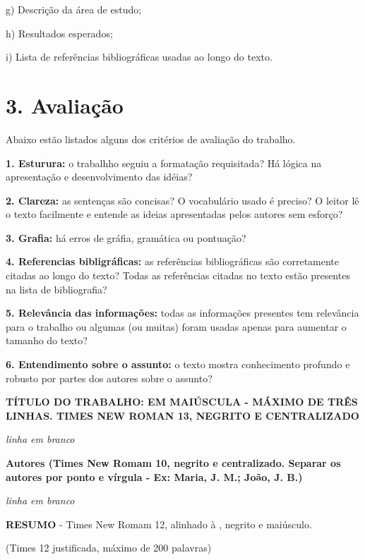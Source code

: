 \documentclass[a4paper,10pt]{article}
\begin{document}
    g) Descrição da área de estudo;
    
    h) Resultados esperados;
        
    i) Lista de referências bibliográficas usadas ao longo do texto. 
  
   \section* {3. Avaliação}
   \noindent
   
    Abaixo estão listados alguns dos critérios de avaliação do trabalho.
    
    \textbf{1. Esturura:} o trabalhho seguiu a formatação requisitada? Há lógica na apresentação e desenvolvimento das idéias? 
    
    \textbf{2. Clareza:} as sentenças são concisas? O vocabulário usado é preciso? O leitor lê o texto facilmente e entende as ideias apresentadas pelos autores sem esforço?
    
    \textbf{3. Grafia:} há erros de gráfia, gramática ou pontuação? 
    
    \textbf{4. Referencias bibligráficas:} as referências bibliográficas são corretamente citadas ao longo do texto? Todas as referências citadas no texto estão presentes na lista de bibliografia? 
    
    \textbf{5. Relevância das informações:} todas as informações presentes tem relevância para o trabalho ou algumas (ou muitas) foram usadas apenas para aumentar o tamanho do texto? 
    
    \textbf{6. Entendimento sobre o assunto:} o texto mostra conhecimento profundo e robusto por partes dos autores sobre o assunto? 

\newpage %
   
  {\centering
  \textbf{TÍTULO DO TRABALHO: EM MAIÚSCULA - MÁXIMO DE TRÊS LINHAS. TIMES NEW ROMAN 13, NEGRITO E  CENTRALIZADO}
  
  \textit{linha em branco}
  
  \textbf{Autores (Times New Romam 10, negrito e centralizado. Separar os autores por ponto e vírgula - Ex: Maria, J. M.; João, J. B.)}
  
  \textit{linha em branco}
  
  \par
  }
  
  \noindent
  \textbf{RESUMO} - Times New Romam 12, alinhado à , negrito e maiúsculo. 
  
  (Times 12 justificada, máximo de 200 palavras)
  
\end{document}
